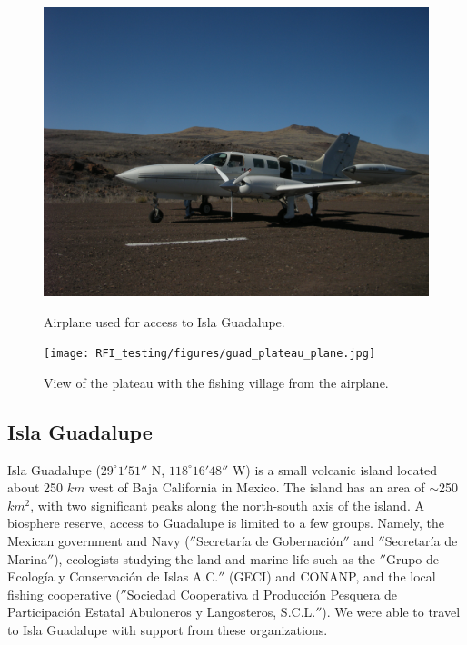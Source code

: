 \begin{figure}[tb]
\centering
\begin{minipage}[b]{0.455\textwidth}
\centering
\includegraphics[width=0.95\linewidth]{RFI_testing/figures/guad_plane.jpg}
\caption{Airplane used for access to Isla Guadalupe.}
\label{Fig:guadplane}
\end{minipage}%
\begin{minipage}[b]{0.02\textwidth}
\hspace{1cm}
\end{minipage}%
\begin{minipage}[b]{0.485\textwidth}
\centering
\texttt{[image: RFI\_testing/figures/guad\_plateau\_plane.jpg]}
\caption{View of the plateau with the fishing village from the airplane.}
\label{Fig:guadplateau}
\end{minipage}
\end{figure}


\subsection{Isla Guadalupe}

Isla Guadalupe ($29^\circ 1' 51''$ N, $118^\circ 16' 48''$ W) is a small volcanic island located about 250 $km$ west of Baja California in Mexico. The island has an area of $\sim$250 $km^2$, with two significant peaks along the north-south axis of the island. A biosphere reserve, access to Guadalupe is limited to a few groups. Namely, the Mexican government and Navy ($''$Secretar\'{i}a de Gobernaci\'{o}n$''$ and $''$Secretar\'{i}a de Marina$''$), ecologists studying the land and marine life such as the $''$Grupo de Ecolog\'{i}a y Conservaci\'{o}n de Islas A.C.$''$ (GECI) and CONANP, and the local fishing cooperative ($''$Sociedad Cooperativa d Producci\'{o}n Pesquera de Participaci\'{o}n Estatal Abuloneros y Langosteros, S.C.L.$''$). We were able to travel to Isla Guadalupe with support from these organizations. 

